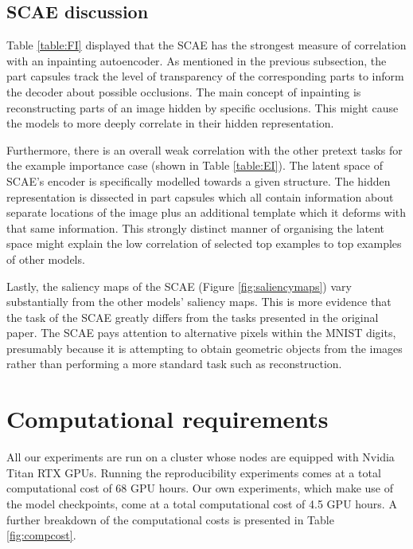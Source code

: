 \subsection{SCAE discussion}
\label{app:scaediscussion}
Table \ref{table:FI} displayed that the SCAE has the strongest measure of correlation with an inpainting autoencoder. As mentioned in the previous subsection, the part capsules track the level of transparency of the corresponding parts to inform the decoder about possible occlusions. The main concept of inpainting is reconstructing parts of an image hidden by specific occlusions. This might cause the models to more deeply correlate in their hidden representation.

Furthermore, there is an overall weak correlation with the other pretext tasks for the example importance case (shown in Table \ref{table:EI}). The latent space of SCAE's encoder is specifically modelled towards a given structure. The hidden representation is dissected in part capsules which all contain information about separate locations of the image plus an additional template which it deforms with that same information. This strongly distinct manner of organising the latent space might explain the low correlation of selected top examples to top examples of other models. 

Lastly, the saliency maps of the SCAE (Figure \ref{fig:saliencymaps}) vary substantially from the other models' saliency maps. This is more evidence that the task of the SCAE greatly differs from the tasks presented in the original paper. The SCAE pays attention to alternative pixels within the MNIST digits, presumably because it is attempting to obtain geometric objects from the images rather than performing a more standard task such as reconstruction.

\newpage 

\section{Computational requirements}
\label{app:comp_req}
All our experiments are run on a cluster whose nodes are equipped with Nvidia Titan
RTX GPUs. Running the reproducibility experiments comes at a total computational
cost of 68 GPU hours. Our own experiments, which make use of the model checkpoints,
come at a total computational cost of 4.5 GPU hours. A further breakdown of the computational costs is presented in Table \ref{fig:compcost}.

